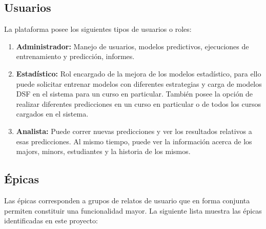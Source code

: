 \subsection{Usuarios \label{sec:user_description}}

La plataforma posee los siguientes tipos de usuarios o roles:

\begin{enumerate}
	\item \textbf{Administrador:} Manejo de usuarios, modelos predictivos, ejecuciones de entrenamiento y predicción, informes.
	\item \textbf{Estadístico:} Rol encargado de la mejora de los modelos estadístico, para ello puede solicitar entrenar modelos con diferentes estrategias y carga de modelos DSF en el sistema para un curso en particular. También posee la opción de realizar diferentes predicciones en un curso en particular o de todos los cursos cargados en el sistema.
	\item \textbf{Analista:} Puede correr nuevas predicciones y ver los resultados relativos a esas predicciones. Al mismo tiempo, puede ver la información acerca de los majors, minors, estudiantes y la historia de los mismos.
\end{enumerate}

\subsection{Épicas \label{sec:user_description}}

Las épicas corresponden a grupos de relatos de usuario que en forma conjunta permiten constituir una funcionalidad mayor. La siguiente lista muestra las épicas identificadas en este proyecto:


